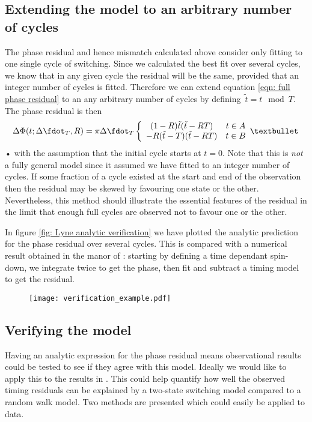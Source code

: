 \documentclass[/home/greg/Thesis/main/main.tex]{subfiles}
\begin{document}
\subsection{Extending the model to an arbitrary number of cycles} The phase
residual and hence mismatch calculated above consider only fitting to 
one single cycle of switching.  Since we calculated the best fit over several cycles, we know that
in any given cycle the residual will be the same, provided that an integer number
of cycles is fitted. Therefore we can extend equation
\eqref{eqn: full phase residual}
to an any arbitrary number of cycles by
defining~$\tilde{t}= t \mod T$. The phase residual is then 
\begin{equation} 
    \Delta\Phi(t; \Delta\fdot_{T}, R) = \pi\Delta\fdot_{T}\two{
        (1-R)\tilde{t}(\tilde{t}-RT)
         }
        {
        -R(\tilde{t}-T)(\tilde{t}-RT)
        }
\label{eqn: arbitary full phase residual}
\end{equation}•
with the assumption that the initial cycle starts at $t=0$. 
Note that this is \emph{not} a fully general model since it assumed we have
fitted to an integer number of cycles. If some fraction of a cycle existed
at the start and end of the observation then the residual may be skewed by
favouring one state or the other. Nevertheless, this method should illustrate
the essential features of the residual in the limit that enough full cycles
are observed not to favour one or the other.

In figure \ref{fig: Lyne analytic verification} we have plotted the analytic 
prediction for the phase residual over several cycles. This is compared with
a numerical result obtained in the manor of \citet{Lyne2010}: starting by defining
a time dependant spin-down, we integrate twice to get the phase, then fit and
subtract a timing model to get the residual. 
\begin{figure}[ht]
    \centering
    \texttt{[image: verification\_example.pdf]}
    \caption{}
    \label{fig: Phase residual}
\end{figure}

\FloatBarrier
\subsection{Verifying the model}
Having an analytic expression for the phase residual means observational results
could be tested to see if they agree with this model. Ideally we would like to
apply this to the results in \citet{Lyne2010}. This could help quantify how
well the observed timing residuals can be explained by a two-state switching model
compared to a random walk model. Two methods are presented which could easily
be applied to data.
\end{document}

